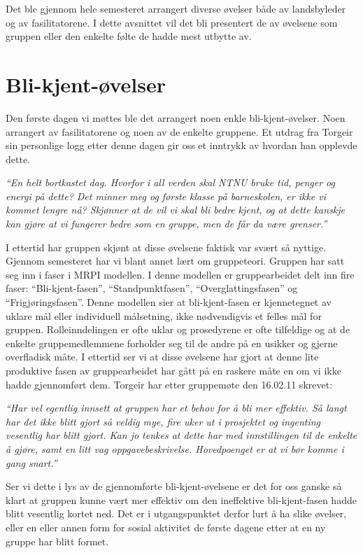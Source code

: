 Det ble gjennom hele semesteret arrangert diverse øvelser både av landsbyleder og av fasilitatorene. 
I dette avsnittet vil det bli presentert de av øvelsene som gruppen eller den enkelte følte de hadde mest utbytte av.

\section{Bli-kjent-øvelser}
Den første dagen vi møttes ble det arrangert noen enkle bli-kjent-øvelser. 
Noen arrangert av fasilitatorene og noen av de enkelte gruppene. 
Et utdrag fra Torgeir sin personlige logg etter denne dagen gir oss et inntrykk av hvordan han opplevde dette.\newline

\emph{“En helt bortkastet dag. Hvorfor i all verden skal NTNU bruke tid, penger og energi på dette? 
Det minner meg og første klasse på barneskolen, er ikke vi kommet lengre nå? 
Skjønner at de vil vi skal bli bedre kjent, og at dette kanskje kan gjøre at vi fungerer bedre som en gruppe, men de får da være grenser.”}\newline


I ettertid har gruppen skjønt at disse øvelsene faktisk var svært så nyttige. 
Gjennom semesteret har vi blant annet lært om gruppeteori. 
Gruppen har satt seg inn i faser i MRPI modellen\cite{MRPI}.
I denne modellen er gruppearbeidet delt inn fire faser: 
“Bli-kjent-fasen”, “Standpunktfasen”, “Overglattingsfasen” og “Frigjøringsfasen”. 
Denne modellen sier at bli-kjent-fasen er kjennetegnet av uklare mål eller individuell målsetning, 
ikke nødvendigvis et felles mål for gruppen. 
Rolleinndelingen er ofte uklar og prosedyrene er ofte tilfeldige og at de enkelte gruppemedlemmene forholder seg til de andre på en usikker og gjerne overfladisk måte.
I ettertid ser vi at disse øvelsene har gjort at denne lite produktive fasen av gruppearbeidet har gått på en raskere måte en om vi ikke hadde gjennomført dem. 
Torgeir har etter gruppemøte den 16.02.11 skrevet:\newline

\emph{“Har vel egentlig innsett at gruppen har et behov for å bli mer effektiv. 
Så langt har det ikke blitt gjort så veldig mye, fire uker ut i prosjektet og ingenting vesentlig har blitt gjort. 
Kan jo tenkes at dette har med innstillingen til de enkelte å gjøre, samt en litt vag oppgavebeskrivelse. 
Hovedpoenget er at vi bør komme i gang snart.”}\newline

Ser vi dette i lys av de gjennomførte bli-kjent-øvelsene er det for oss ganske så klart at gruppen kunne vært mer effektiv om den ineffektive bli-kjent-fasen hadde blitt vesentlig kortet ned. 
Det er i utgangspunktet derfor lurt å ha slike øvelser, eller en eller annen form for sosial aktivitet de første dagene etter at en ny gruppe har blitt formet.

